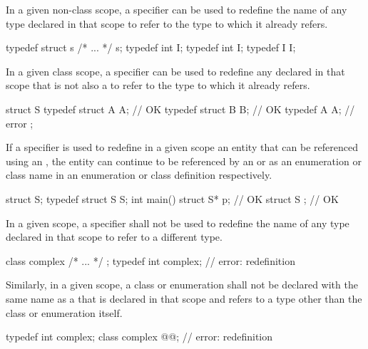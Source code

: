 \pnum
{}%
In a given non-class scope, a  specifier can be used to
redefine the name of any type declared in that scope to refer to the
type to which it already refers.
\enterexample

\begin{codeblock}
typedef struct s { /* ... */ } s;
typedef int I;
typedef int I;
typedef I I;
\end{codeblock}
\exitexample

\pnum
In a given class scope, a  specifier can be used to
redefine any  declared in that scope that is not
also a  to refer to the type to which it already
refers.
\enterexample

\begin{codeblock}
struct S {
  typedef struct A { } A;       // OK
  typedef struct B B;           // OK
  typedef A A;                  // error
};
\end{codeblock}
\exitexample

\pnum
If a  specifier is used to redefine in a given scope an
entity that can be referenced using an ,
the entity can continue to be referenced by an
 or as an enumeration or class name
in an enumeration or class definition respectively. \enterexample
\begin{codeblock}
struct S;
typedef struct S S;
int main() {
  struct S* p;                  // OK
}
struct S { };                   // OK
\end{codeblock}
\exitexample

\pnum
In a given scope, a  specifier shall not be used to
redefine the name of any type declared in that scope to refer to a
different type.
\enterexample

\begin{codeblock}
class complex { /* ... */ };
typedef int complex;            // error: redefinition
\end{codeblock}
\exitexample

\pnum
Similarly, in a given scope, a class or enumeration shall not be
declared with the same name as a  that is
declared in that scope and refers to a type other than the class or
enumeration itself.
\enterexample

\begin{codeblock}
typedef int complex;
class complex @@;   // error: redefinition
\end{codeblock}
\exitexample

